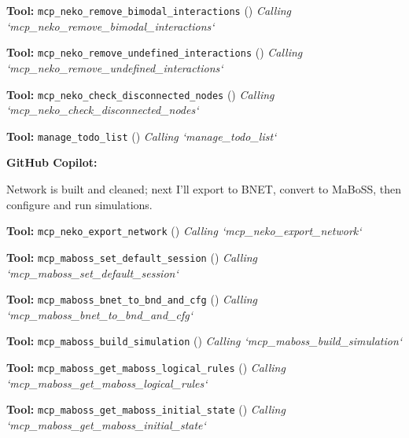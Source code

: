 \documentclass[11pt,a4paper]{article}
\begin{document}
\begin{toolokbox}
\textbf{Tool:} \texttt{mcp\_neko\_remove\_bimodal\_interactions} (\checkmark)
\textit{Calling `mcp\_neko\_remove\_bimodal\_interactions`}
\end{toolokbox}
\begin{toolokbox}
\textbf{Tool:} \texttt{mcp\_neko\_remove\_undefined\_interactions} (\checkmark)
\textit{Calling `mcp\_neko\_remove\_undefined\_interactions`}
\end{toolokbox}
\begin{toolokbox}
\textbf{Tool:} \texttt{mcp\_neko\_check\_disconnected\_nodes} (\checkmark)
\textit{Calling `mcp\_neko\_check\_disconnected\_nodes`}
\end{toolokbox}
\begin{toolokbox}
\textbf{Tool:} \texttt{manage\_todo\_list} (\checkmark)
\textit{Calling `manage\_todo\_list`}
\end{toolokbox}
\begin{copilotbox}
\textbf{GitHub Copilot:}

Network is built and cleaned; next I’ll export to BNET, convert to MaBoSS, then configure and run simulations.

\end{copilotbox}
\begin{toolokbox}
\textbf{Tool:} \texttt{mcp\_neko\_export\_network} (\checkmark)
\textit{Calling `mcp\_neko\_export\_network`}
\end{toolokbox}
\begin{toolokbox}
\textbf{Tool:} \texttt{mcp\_maboss\_set\_default\_session} (\checkmark)
\textit{Calling `mcp\_maboss\_set\_default\_session`}
\end{toolokbox}
\begin{toolokbox}
\textbf{Tool:} \texttt{mcp\_maboss\_bnet\_to\_bnd\_and\_cfg} (\checkmark)
\textit{Calling `mcp\_maboss\_bnet\_to\_bnd\_and\_cfg`}
\end{toolokbox}
\begin{toolokbox}
\textbf{Tool:} \texttt{mcp\_maboss\_build\_simulation} (\checkmark)
\textit{Calling `mcp\_maboss\_build\_simulation`}
\end{toolokbox}
\begin{toolokbox}
\textbf{Tool:} \texttt{mcp\_maboss\_get\_maboss\_logical\_rules} (\checkmark)
\textit{Calling `mcp\_maboss\_get\_maboss\_logical\_rules`}
\end{toolokbox}
\begin{toolokbox}
\textbf{Tool:} \texttt{mcp\_maboss\_get\_maboss\_initial\_state} (\checkmark)
\textit{Calling `mcp\_maboss\_get\_maboss\_initial\_state`}
\end{toolokbox}
\end{document}
